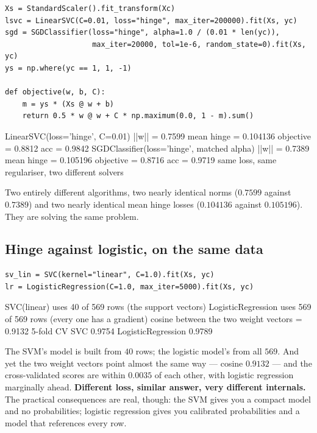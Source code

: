\documentclass[11pt]{article}
\begin{document}
\begin{lstlisting}
Xs = StandardScaler().fit_transform(Xc)
lsvc = LinearSVC(C=0.01, loss="hinge", max_iter=200000).fit(Xs, yc)
sgd = SGDClassifier(loss="hinge", alpha=1.0 / (0.01 * len(yc)),
                    max_iter=20000, tol=1e-6, random_state=0).fit(Xs, yc)
ys = np.where(yc == 1, 1, -1)

def objective(w, b, C):
    m = ys * (Xs @ w + b)
    return 0.5 * w @ w + C * np.maximum(0.0, 1 - m).sum()
\end{lstlisting}
\begin{codeout}
LinearSVC(loss='hinge', C=0.01)
   ||w|| = 0.7599   mean hinge = 0.104136   objective = 0.8812   acc = 0.9842
SGDClassifier(loss='hinge', matched alpha)
   ||w|| = 0.7389   mean hinge = 0.105196   objective = 0.8716   acc = 0.9719
same loss, same regulariser, two different solvers
\end{codeout}

Two entirely different algorithms, two nearly identical norms
($0.7599$ against $0.7389$) and two nearly identical mean hinge losses
($0.104136$ against $0.105196$). They are solving the same problem.

\subsection{Hinge against logistic, on the same data}

\begin{lstlisting}
sv_lin = SVC(kernel="linear", C=1.0).fit(Xs, yc)
lr = LogisticRegression(C=1.0, max_iter=5000).fit(Xs, yc)
\end{lstlisting}
\begin{codeout}
SVC(linear)          uses 40 of 569 rows (the support vectors)
LogisticRegression   uses 569 of 569 rows (every one has a gradient)
cosine between the two weight vectors = 0.9132
5-fold CV  SVC 0.9754   LogisticRegression 0.9789
\end{codeout}

The SVM's model is built from $40$ rows; the logistic model's from all $569$.
And yet the two weight vectors point almost the same way --- cosine $0.9132$ ---
and the cross-validated scores are within $0.0035$ of each other, with logistic
regression marginally ahead. \textbf{Different loss, similar answer, very
different internals.} The practical consequences are real, though: the SVM
gives you a compact model and no probabilities; logistic regression gives you
calibrated probabilities and a model that references every row.
\end{document}
